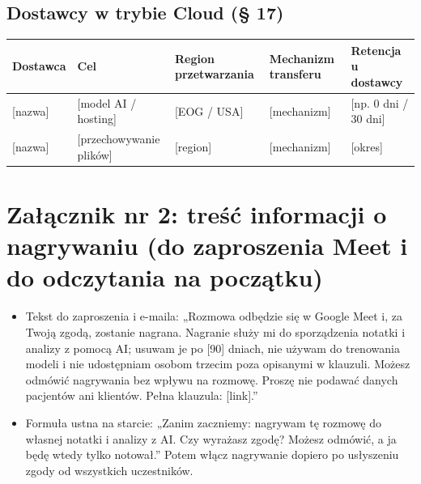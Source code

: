 \documentclass[11pt,a4paper]{article}
\begin{document}
\subsection*{Dostawcy w trybie Cloud (§ 17)}
\begin{tabularx}{\linewidth}{@{}XXXXX@{}}
\toprule
Dostawca & Cel & Region przetwarzania & Mechanizm transferu & Retencja u dostawcy \\
\midrule
{}[nazwa] & [model AI / hosting] & [EOG / USA] & [mechanizm] & [np. 0 dni / 30 dni] \\
{}[nazwa] & [przechowywanie plików] & [region] & [mechanizm] & [okres] \\
\bottomrule
\end{tabularx}

\section*{Załącznik nr 2: treść informacji o nagrywaniu (do zaproszenia Meet i do odczytania na początku)}

\begin{itemize}
\item Tekst do zaproszenia i e-maila: „Rozmowa odbędzie się w Google Meet i, za Twoją zgodą, zostanie nagrana. Nagranie służy mi do sporządzenia notatki i analizy z pomocą AI; usuwam je po [90] dniach, nie używam do trenowania modeli i nie udostępniam osobom trzecim poza opisanymi w klauzuli. Możesz odmówić nagrywania bez wpływu na rozmowę. Proszę nie podawać danych pacjentów ani klientów. Pełna klauzula: [link].”
\item Formuła ustna na starcie: „Zanim zaczniemy: nagrywam tę rozmowę do własnej notatki i analizy z AI. Czy wyrażasz zgodę? Możesz odmówić, a ja będę wtedy tylko notował.” Potem włącz nagrywanie dopiero po usłyszeniu zgody od wszystkich uczestników.
\end{itemize}
\end{document}
